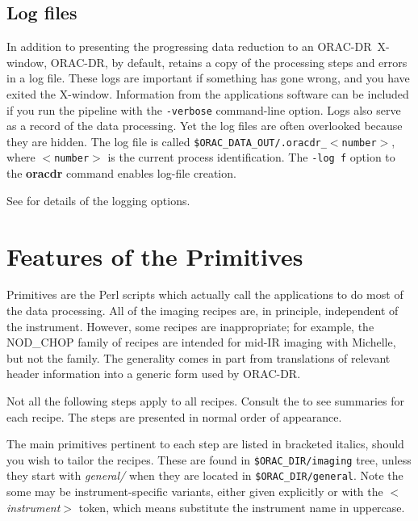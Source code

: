 \documentclass[twoside,11pt,nolof]{starlink}
\providecommand{\ORACDR}{{\footnotesize ORAC-DR}}
\begin{document}
\subsection{Log files\label{log_files}}

In addition to presenting the progressing data reduction to an
\ORACDR\ X-window, \ORACDR, by default, retains a copy of the
processing steps and errors in a log file.  These logs are important
if something has gone wrong, and you have exited the X-window.
Information from the applications software can be included if you run
the pipeline with the \texttt{-verbose} command-line option.  Logs also
serve as a record of the data processing.  Yet the log files are often
overlooked because they are hidden.  The log file is called
{\tt\$ORAC\_DATA\_OUT/.oracdr\_$<$number$>$}, where {\tt$<$number$>$}
is the current process identification.  The \texttt{-log f} option to the
\textbf{oracdr} command enables log-file creation.

See  for details of the
logging options.

\section{Features of the
Primitives\label{features_of_the_primitives}}

Primitives are the Perl scripts which actually call the applications
to do most of the data processing.  All of the imaging recipes are, in
principle, independent of the instrument.  However, some recipes are
inappropriate; for example, the NOD\_CHOP family of recipes are
intended for mid-IR imaging with Michelle, but not the
 family.  The generality
comes in part from translations of relevant header information into a
generic form used by \ORACDR.

Not all the following steps apply to all recipes.  Consult the
 to see summaries for each recipe.
The steps are presented in normal order of appearance.

The main primitives pertinent to each step are listed in bracketed
italics, should you wish to tailor the recipes.  These are found in
{\tt\$ORAC\_DIR/imaging} tree, unless they start with \emph{general/}
when they are located in {\tt\$ORAC\_DIR/general}.  Note the some may
be instrument-specific variants, either given explicitly or with the
\emph{$<$instrument$>$} token, which means substitute the instrument
name in uppercase.
\end{document}

